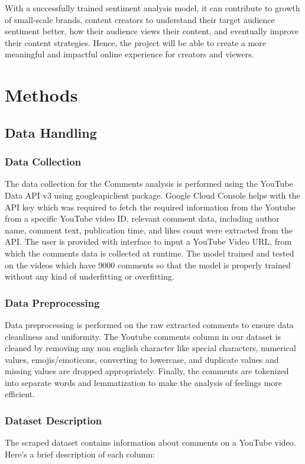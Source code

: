 \documentclass[11pt,article,oneside]{article}
\begin{document}
With a successfully trained sentiment analysis model, it can contribute to growth of small-scale brands, content creators to understand their target audience sentiment better, how their audience views their content, and eventually improve their content strategies. Hence, the project will be able to create a more meaningful and impactful online experience for creators and viewers. \\

\section{Methods}

\subsection{Data Handling}
\subsubsection{Data Collection}
The data collection for the Comments analysis is performed using the YouTube Data API v3\citep{youtubeApiUsage} using googleapiclient package. Google Cloud Console\citep{youtubeAPIKey} helps with the API key which was required to fetch the required information from the Youtube from a specific YouTube video ID, relevant comment data, including author name, comment text, publication time, and likes count were extracted from the API. The user is provided with interface to input a YouTube Video URL, from which the comments data is collected at runtime. The model trained and tested on the videos which have 9000 comments so that the model is properly trained without any kind of underfitting or overfitting.

\subsubsection{Data Preprocessing}
Data preprocessing is performed on the raw extracted comments to ensure data cleanliness and uniformity. The Youtube comments column in our dataset is cleaned by removing any non english character like special characters, numerical values, emojis/emoticons, converting to lowercase, and duplicate values and missing values are dropped appropriately. Finally, the comments are tokenized into separate words and lemmatization to make the analysis of feelings more efficient.

\subsubsection{Dataset Description}
The scraped dataset contains information about comments on a YouTube video. Here's a brief description of each column:
\end{document}
